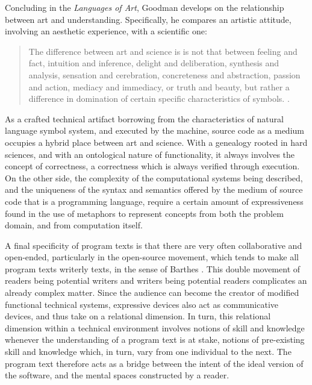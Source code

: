 Concluding in the \emph{Languages of Art}, Goodman develops on the relationship between art and understanding. Specifically, he compares an artistic attitude, involving an aesthetic experience, with a scientific one:

\begin{quote}
  The difference between art and science is is not that between feeling and fact, intuition and inference, delight and deliberation, synthesis and analysis, sensation and cerebration, concreteness and abstraction, passion and action, mediacy and immediacy, or truth and beauty, but rather a difference in domination of certain specific characteristics of symbols. \citep{goodman_languages_1976}.
\end{quote}

As a crafted technical artifact borrowing from the characteristics of natural language symbol system, and executed by the machine, source code as a medium occupies a hybrid place between art and science. With a genealogy rooted in hard sciences, and with an ontological nature of functionality, it always involves the concept of correctness, a correctness which is always verified through execution. On the other side, the complexity of the computational systems being described, and the uniqueness of the syntax and semantics offered by the medium of source code that is a programming language, require a certain amount of expressiveness found in the use of metaphors to represent concepts from both the problem domain, and from computation itself.

A final specificity of program texts is that there are very often collaborative and open-ended, particularly in the open-source movement, which tends to make all program texts writerly texts, in the sense of Barthes \citep{barthes_bruissement_1984}. This double movement of readers being potential writers and writers being potential readers complicates an already complex matter. Since the audience can become the creator of modified functional technical systems, expressive devices also act as communicative devices, and thus take on a relational dimension. In turn, this relational dimension within a technical environment involves notions of skill and knowledge whenever the understanding of a program text is at stake, notions of pre-existing skill and knowledge which, in turn, vary from one individual to the next. The program text therefore acts as a bridge between the intent of the ideal version of the software, and the mental spaces constructed by a reader.

